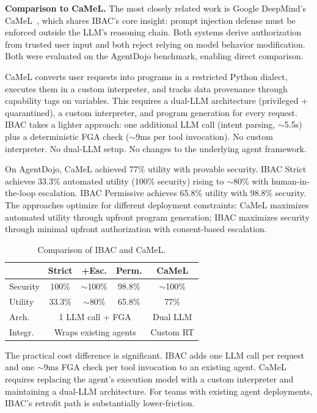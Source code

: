\documentclass[11pt]{article}
\begin{document}
\textbf{Comparison to CaMeL.} The most closely related work is Google DeepMind's CaMeL~\cite{debenedetti2025camel}, which shares IBAC's core insight: prompt injection defense must be enforced outside the LLM's reasoning chain. Both systems derive authorization from trusted user input and both reject relying on model behavior modification. Both were evaluated on the AgentDojo benchmark, enabling direct comparison.

CaMeL converts user requests into programs in a restricted Python dialect, executes them in a custom interpreter, and tracks data provenance through capability tags on variables. This requires a dual-LLM architecture (privileged + quarantined), a custom interpreter, and program generation for every request. IBAC takes a lighter approach: one additional LLM call (intent parsing, ${\sim}$5.5s) plus a deterministic FGA check (${\sim}$9ms per tool invocation). No custom interpreter. No dual-LLM setup. No changes to the underlying agent framework.

On AgentDojo, CaMeL achieved 77\% utility with provable security. IBAC Strict achieves 33.3\% automated utility (100\% security) rising to ${\sim}$80\% with human-in-the-loop escalation. IBAC Permissive achieves 65.8\% utility with 98.8\% security. The approaches optimize for different deployment constraints: CaMeL maximizes automated utility through upfront program generation; IBAC maximizes security through minimal upfront authorization with consent-based escalation.

\begin{table}[H]
\centering
\caption{Comparison of IBAC and CaMeL.}
\label{tab:camel}
\small
\begin{tabular}{lcccc}
\toprule
 & \textbf{Strict} & \textbf{+Esc.} & \textbf{Perm.} & \textbf{CaMeL} \\
\midrule
Security & 100\% & ${\sim}$100\% & 98.8\% & ${\sim}$100\% \\
Utility & 33.3\% & ${\sim}$80\% & 65.8\% & 77\% \\
Arch. & \multicolumn{3}{c}{1 LLM call + FGA} & Dual LLM \\
Integr. & \multicolumn{3}{c}{Wraps existing agents} & Custom RT \\
\bottomrule
\end{tabular}
\end{table}

The practical cost difference is significant. IBAC adds one LLM call per request and one ${\sim}$9ms FGA check per tool invocation to an existing agent. CaMeL requires replacing the agent's execution model with a custom interpreter and maintaining a dual-LLM architecture. For teams with existing agent deployments, IBAC's retrofit path is substantially lower-friction.
\end{document}
